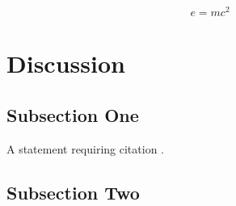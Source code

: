 \documentclass[twoside,twocolumn]{article}
\begin{document}
\blindtext %

\begin{equation}
\label{eq:emc}
e = mc^2
\end{equation}

\blindtext %


\section{Discussion}

\subsection{Subsection One}

A statement requiring citation \cite{Sutton1998}.
\blindtext %

\subsection{Subsection Two}

\blindtext %


\printbibliography

\end{document}
